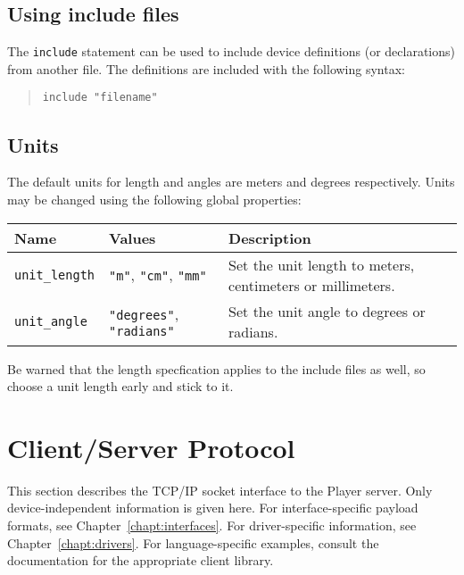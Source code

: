 \documentclass[11pt]{report}
\begin{document}
\section{Using include files}

The \verb'include' statement can be used to include device definitions
(or declarations) from another file.  The definitions are included with the 
following syntax:
\begin{quote}
\begin{verbatim}
include "filename"
\end{verbatim}
\end{quote}

\section{Units}

The default units for length and angles are meters and degrees
respectively.  Units may be changed using the following global
properties:

\begin{center}
\begin{tabularx}{.9\textwidth}{|l|l|X|}
\hline
Name & Values & Description \\
\hline
\verb'unit_length' & \verb'"m"', \verb'"cm"', \verb'"mm"'
& Set the unit length to meters, centimeters or millimeters. \\
\hline
\verb'unit_angle' & \verb'"degrees"', \verb'"radians"'
& Set the unit angle to degrees or radians.\\
\hline
\end{tabularx}
\end{center}

\noindent
Be warned that the length specfication applies to the include files as well,
so choose a unit length early and stick to it.

\chapter{Client/Server Protocol}
\label{chapt:socket}
This section describes the TCP/IP socket interface to the Player server.
Only device-independent information is given here.  For interface-specific
payload formats, see Chapter~\ref{chapt:interfaces}.  For driver-specific
information, see Chapter~\ref{chapt:drivers}.  For language-specific
examples, consult the documentation for the appropriate client library.
\end{document}
